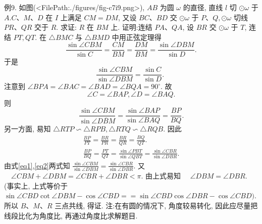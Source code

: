 例9. 如图(<FilePath:./figures/fig-c7i9.png>), $A B$ 为圆 $\omega$ 的直径, 直线 $l$ 切 $\odot \omega$ 于 $A . C 、 M 、 D$ 在 $I$ 上满足 $C M=D M$, 又设 $B C 、 B D$ 交 $\odot \omega$ 于 $P 、 Q, \odot \omega$ 切线 $P R 、 Q R$ 交于 $R$. 求证: $R$ 在 $B M$ 上.
证明:连结 $P A 、 Q A$, 设 $B R$ 交 $\odot \omega$ 于 $T$, 连结
$P T, Q T$.
在 $\triangle B M C$ 与 $\triangle B M D$ 中用正弦定理得
$$
\frac{\sin \angle C B M}{\sin C}=\frac{C M}{B M}=\frac{D M}{B M}=\frac{\sin \angle D B M}{\sin D} .
$$
于是
$$
\frac{\sin \angle C B M}{\sin \angle D B M}=\frac{\sin C}{\sin D} \text {. }
$$
注意到 $\angle B P A=\angle B A C=\angle B A D=\angle B Q A=90^{\circ}$.
故
$$
\angle C=\angle B A P, \angle D=\angle B A Q .
$$
则
$$
\frac{\sin \angle C B M}{\sin \angle \overline{D B M}}=\frac{\sin \angle B A P}{\sin \angle B A Q}=\frac{B P}{B Q} . \label{eq1}
$$
另一方面, 易知 $\triangle R T P \backsim \triangle R P B, \triangle R T Q \backsim \triangle R Q B$.
因此
$$
\begin{gathered}
\frac{B P}{P T}=\frac{B R}{P R}=\frac{B R}{Q R}=\frac{B Q}{Q T} . \\
\frac{B P}{B Q}=\frac{P T}{Q T}=\frac{\sin \angle P B T}{\sin \angle Q B T}=\frac{\sin \angle C B R}{\sin \angle D B R} . \label{eq2}
\end{gathered}
$$
由式\ref{eq1},\ref{eq2}两式知 $\frac{\sin \angle C B M}{\sin \angle D B M}=\frac{\sin \angle C B R}{\sin \angle D B R}$.
又 $\quad \angle C B M+\angle D B M=\angle C B R+\angle D B R<\pi$.
由上式易知 $\quad \angle D B M=\angle D B R$.
(事实上, 上式等价于 $\sin \angle C B D \cot \angle D B M-\cos \angle C B D== \sin \angle C B D \cos \angle D B R-\cos \angle C B D)$.
所以 $B 、 M 、 R$ 三点共线, 得证.
注:在有圆的情况下, 角度较易转化, 因此应尽量把线段比化为角度比, 再通过角度比求解题目.



